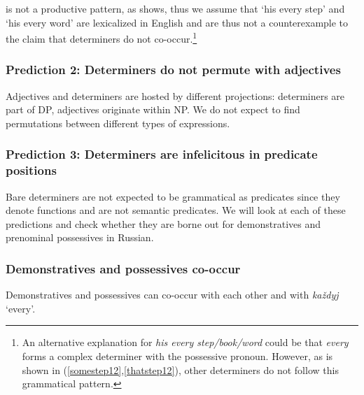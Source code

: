 \documentclass[output=paper,
colorlinks,
citecolor=brown,
newtxmath
]{langscibook}
\begin{document}
 is not a productive pattern, as  shows, thus we assume that `his every step' and `his every word' are lexicalized in English and are thus not a counter\-example to the claim that determiners do not co-occur.\footnote{An alternative explanation for \textit{his every step/book/word} could be that \textit{every} forms a complex determiner with the possessive pronoun. However, as is shown in (\ref{somestep12},\ref{thatstep12}), other determiners do not follow this grammatical pattern.}


\ea\label{false}
    \label{somestep12}
    \label{thatstep12}
\z\z

\subsubsection{Prediction 2: Determiners do not permute with adjectives}

\noindent Adjectives and determiners are hosted by different projections: determiners are part of DP, adjectives originate within NP. We do not expect to find permutations between different types of expressions.


\z

\subsubsection{Prediction 3: Determiners are infelicitous in predicate positions}

Bare determiners are not expected to be grammatical as predicates since they denote functions and are not semantic predicates. We will look at each of these predictions and check whether they are borne out for demonstratives and prenominal possessives in Russian. 


\subsubsection{Demonstratives and possessives co-occur}

Demonstratives and possessives can co-occur with each other and with \textit{každyj} `every'.

\end{document}
